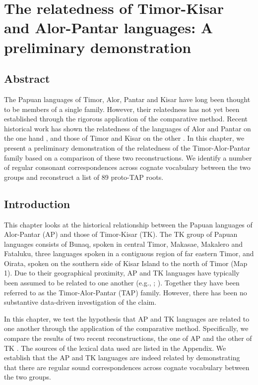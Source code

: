 
\chapter{The relatedness of Timor-Kisar and Alor-Pantar languages: A preliminary demonstration}

\section*{Abstract}
The Papuan languages of Timor, Alor, Pantar and Kisar have long been thought to be members of a single family. However, their relatedness has not yet been established through the rigorous application of the comparative method. Recent historical work has shown the relatedness of the languages of Alor and Pantar on the one hand \citep{HoltonEtAl2012}, and those of Timor and Kisar on the other \citep{SchapperEtAl2012}. In this chapter, we present a preliminary demonstration of the relatedness of the Timor-Alor-Pantar family based on a comparison of these two reconstructions. We identify a number of regular consonant correspondences across cognate vocabulary between the two groups and reconstruct a list of 89 proto-TAP roots.

\section{Introduction}
This chapter looks at the historical relationship between the Papuan languages of Alor-Pantar (AP) and those of Timor-Kisar (TK). The TK group of Papuan languages consists of Bunaq, spoken in central Timor, Makasae, Makalero and Fataluku, three languages spoken in a contiguous region of far eastern Timor, and Oirata, spoken on the southern side of Kisar Island to the north of Timor (Map 1). Due to their geographical proximity, AP and TK languages have typically been assumed to be related to one another (e.g., \citet{Stokhof1975}; \citet{Capell1975}). Together they have been referred to as the Timor-Alor-Pantar (TAP) family. However, there has been no substantive data-driven investigation of the claim.

In this chapter, we test the hypothesis that AP and TK languages are related to one another through the application of the comparative method. Specifically, we compare the results of two recent reconstructions, the one of AP \citep{HoltonEtAl2012} and the other of TK \citep{SchapperEtAl2012}. The sources of the lexical data used are listed in the Appendix. We establish that the AP and TK languages are indeed related by demonstrating that there are regular sound correspondences across cognate vocabulary between the two groups.

